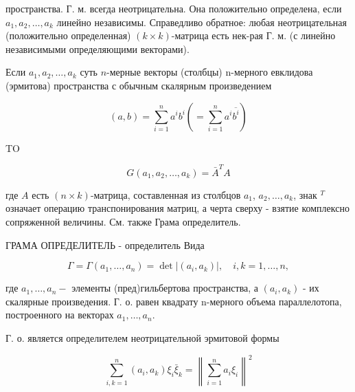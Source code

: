 \documentclass[10pt]{article}
\begin{document}
пространства. Г. м. всегда неотрицательна. Она положительно определена, если $a_{1}, a_{2}, \ldots, a_{k}$ линейно независимы. Справедливо обратное: любая неотрицательная (положительно определенная) $(k \times k)$-матрица есть нек-рая Г. м. (с линейно независимыми определяющими векторами).



Если $a_{1}, a_{2}, \ldots, a_{k}$ суть $n$-мерные векторы (столбцы) n-мерного евклидова (эрмитова) пространства с обычным скалярным произведением



\[

(a, b)=\sum_{i=1}^{n} a^{i} b^{i}\left(=\sum_{i=1}^{n} a^{i} \overline{b^{i}}\right)

\]



TO



\[

G\left(a_{1}, a_{2}, \ldots, a_{k}\right)=\bar{A}^{T} A

\]



где $A$ есть $(n \times k)$-матрица, составленная из столбцов $a_{1}$, $a_{2}, \ldots, a_{k}$, знак ${ }^{T}$ означает операцию транспонирования матриц, а черта сверху - взятие комплексно сопряженной величины. См. также Грама определитель.



ГРАМА ОПРЕДЕЛИТЕЛЬ - определитель Вида



\[

\Gamma=\Gamma\left(a_{1}, \ldots, a_{n}\right)=\operatorname{det}\left|\left(a_{i}, a_{k}\right)\right|, \quad i, k=1, \ldots, n,

\]



где $a_{1}, \ldots, a_{n}-$ элементы (пред)гильбертова пространства, а $\left(a_{i}, a_{k}\right)$ - их скалярные произведения. Г. о. равен квадрату n-мерного объема параллелотопа, построенного на векторах $a_{1}, \ldots, a_{n}$.



Г. о. является определителем неотрицательной эрмитовой формы



\[

\sum_{i, k=1}^{n}\left(a_{i}, a_{k}\right) \xi_{i} \bar{\xi}_{k}=\left\|\sum_{i=1}^{n} a_{i} \xi_{i}\right\|^{2}

\]
\end{document}
